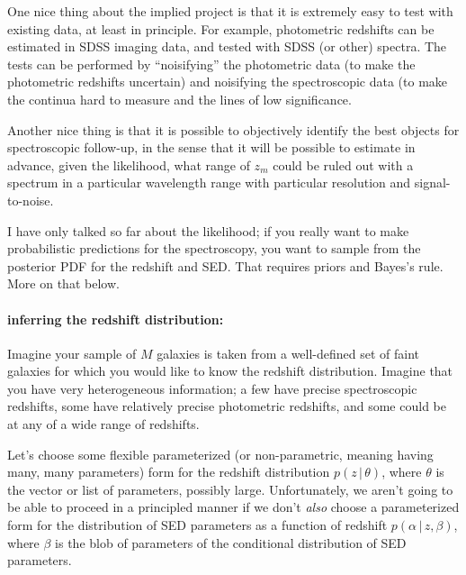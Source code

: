 \documentclass[12pt]{article}
\newcommand{\given}{\,|\,}
\begin{document}
One nice thing about the implied project is that it is extremely easy
to test with existing data, at least in principle.  For example,
photometric redshifts can be estimated in SDSS imaging data, and
tested with SDSS (or other) spectra.  The tests can be performed by
``noisifying'' the photometric data (to make the photometric redshifts
uncertain) and noisifying the spectroscopic data (to make the continua
hard to measure and the lines of low significance.

Another nice thing is that it is possible to objectively identify the
best objects for spectroscopic follow-up, in the sense that it will be
possible to estimate in advance, given the likelihood, what range of
$z_m$ could be ruled out with a spectrum in a particular wavelength
range with particular resolution and signal-to-noise.

I have only talked so far about the likelihood; if you really want to
make probabilistic predictions for the spectroscopy, you want to
sample from the posterior PDF for the redshift and SED.  That requires
priors and Bayes's rule.  More on that below.

\paragraph{inferring the redshift distribution:}
Imagine your sample of $M$ galaxies is taken from a well-defined set
of faint galaxies for which you would like to know the redshift
distribution.  Imagine that you have very heterogeneous information; a
few have precise spectroscopic redshifts, some have relatively precise
photometric redshifts, and some could be at any of a wide range of
redshifts.

Let's choose some flexible parameterized (or non-parametric, meaning
having many, many parameters) form for the redshift distribution $p(z
\given \theta)$, where $\theta$ is the vector or list of parameters,
possibly large.  Unfortunately, we aren't going to be able to proceed
in a principled manner if we don't \emph{also} choose a parameterized
form for the distribution of SED parameters as a function of redshift
$p(\alpha \given z, \beta)$, where $\beta$ is the blob of parameters
of the conditional distribution of SED parameters.
\end{document}
